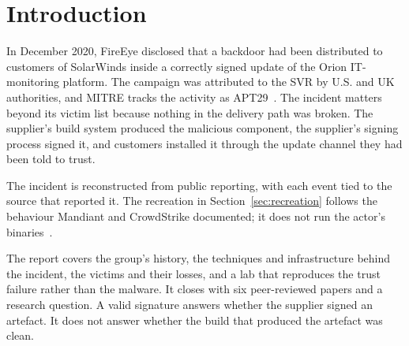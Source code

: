 \section{Introduction}

In December 2020, FireEye disclosed that a backdoor had been distributed to customers of SolarWinds inside a correctly signed update of the Orion IT-monitoring platform. The campaign was attributed to the SVR by U.S. and UK authorities, and MITRE tracks the activity as APT29~\cite{mitre-apt29,aa22-110a}. The incident matters beyond its victim list because nothing in the delivery path was broken. The supplier's build system produced the malicious component, the supplier's signing process signed it, and customers installed it through the update channel they had been told to trust.

The incident is reconstructed from public reporting, with each event tied to the source that reported it. The recreation in Section~\ref{sec:recreation} follows the behaviour Mandiant and CrowdStrike documented; it does not run the actor's binaries~\cite{mandiant-sunburst-details,crowdstrike-sunspot}.

The report covers the group's history, the techniques and infrastructure behind the incident, the victims and their losses, and a lab that reproduces the trust failure rather than the malware. It closes with six peer-reviewed papers and a research question. A valid signature answers whether the supplier signed an artefact. It does not answer whether the build that produced the artefact was clean.
